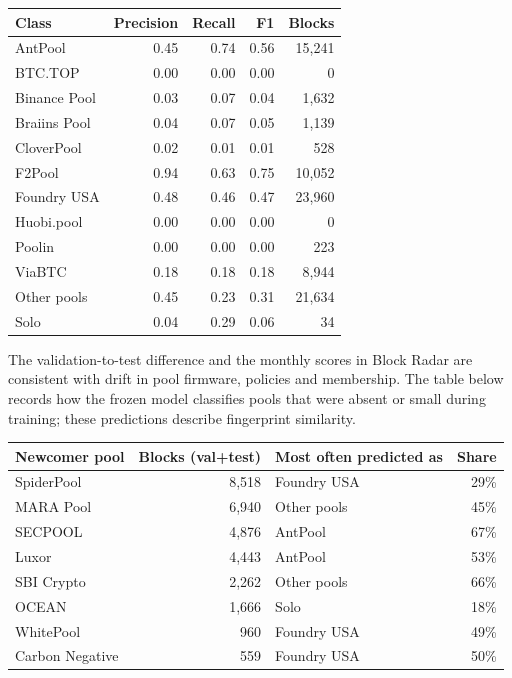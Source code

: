 \documentclass[
  11pt,
  a4paper,
]{article}
\newenvironment{reporttable}{\par\small\sffamily}{\par}
\begin{document}
\begin{reporttable}

\begin{longtable}[]{@{}lrrrr@{}}
\toprule\noalign{}
\textbf{Class} & \textbf{Precision} & \textbf{Recall} & \textbf{F1} &
\textbf{Blocks} \\
\midrule\noalign{}
\endhead
\bottomrule\noalign{}
\endlastfoot
AntPool & 0.45 & 0.74 & 0.56 & 15,241 \\
BTC.TOP & 0.00 & 0.00 & 0.00 & 0 \\
Binance Pool & 0.03 & 0.07 & 0.04 & 1,632 \\
Braiins Pool & 0.04 & 0.07 & 0.05 & 1,139 \\
CloverPool & 0.02 & 0.01 & 0.01 & 528 \\
F2Pool & 0.94 & 0.63 & 0.75 & 10,052 \\
Foundry USA & 0.48 & 0.46 & 0.47 & 23,960 \\
Huobi.pool & 0.00 & 0.00 & 0.00 & 0 \\
Poolin & 0.00 & 0.00 & 0.00 & 223 \\
ViaBTC & 0.18 & 0.18 & 0.18 & 8,944 \\
Other pools & 0.45 & 0.23 & 0.31 & 21,634 \\
Solo & 0.04 & 0.29 & 0.06 & 34 \\
\end{longtable}

\end{reporttable}

The validation-to-test difference and the monthly scores in Block Radar
are consistent with drift in pool firmware, policies and membership. The
table below records how the frozen model classifies pools that were
absent or small during training; these predictions describe fingerprint
similarity.

\begin{reporttable}

\begin{longtable}[]{@{}lrlr@{}}
\toprule\noalign{}
\textbf{Newcomer pool} & \textbf{Blocks (val+test)} & \textbf{Most often
predicted as} & \textbf{Share} \\
\midrule\noalign{}
\endhead
\bottomrule\noalign{}
\endlastfoot
SpiderPool & 8,518 & Foundry USA & 29\% \\
MARA Pool & 6,940 & Other pools & 45\% \\
SECPOOL & 4,876 & AntPool & 67\% \\
Luxor & 4,443 & AntPool & 53\% \\
SBI Crypto & 2,262 & Other pools & 66\% \\
OCEAN & 1,666 & Solo & 18\% \\
WhitePool & 960 & Foundry USA & 49\% \\
Carbon Negative & 559 & Foundry USA & 50\% \\
\end{longtable}

\end{reporttable}
\end{document}
